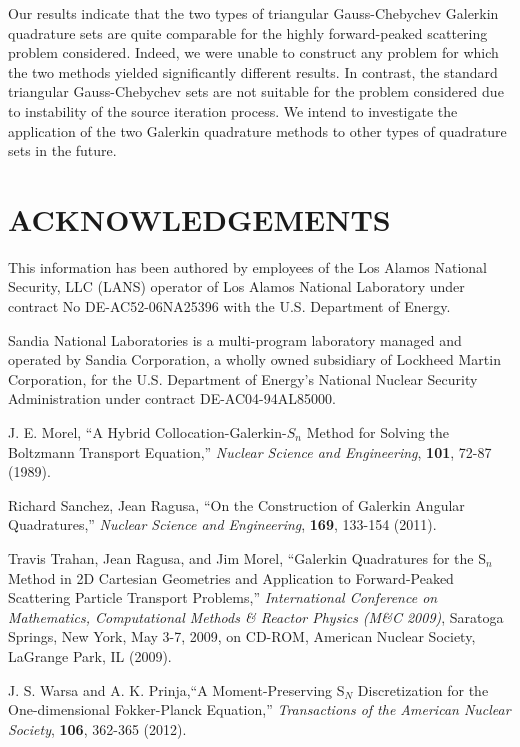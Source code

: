 \documentclass[12pt]{article}
\begin{document}
\begin{center}
Our results indicate that the two types of triangular Gauss-Chebychev Galerkin quadrature sets are quite comparable for 
the highly forward-peaked scattering problem considered.  Indeed, we were unable to construct any problem for which the two 
methods yielded significantly different results.  In contrast, the standard triangular Gauss-Chebychev sets are not suitable 
for the problem considered due to instability of the source iteration process.   We intend to investigate 
the application of the two Galerkin quadrature methods to other types of quadrature sets in the future.   

  

\section*{ACKNOWLEDGEMENTS}

This information has been authored by employees of the Los Alamos National Security, LLC (LANS) operator of Los Alamos 
National Laboratory under contract No DE-AC52-06NA25396 with the U.S. Department of Energy.

Sandia National Laboratories is a multi-program laboratory managed and operated by Sandia Corporation, a wholly owned 
subsidiary of Lockheed Martin Corporation, for the U.S. Department of Energy's National Nuclear Security Administration 
under contract DE-AC04-94AL85000.
 

\setlength{\baselineskip}{12pt}
\begin{thebibliography}{300}

 J. E. Morel, ``A Hybrid Collocation-Galerkin-$S_n$  Method for Solving the
Boltzmann Transport Equation,'' {\em Nuclear Science and Engineering}, {\bf 101}, 72-87 (1989).

 Richard Sanchez, Jean Ragusa, ``On the Construction of Galerkin Angular Quadratures,''
{\em Nuclear Science and Engineering}, {\bf 169}, 133-154 (2011).

 Travis Trahan, Jean Ragusa, and Jim Morel, ``Galerkin Quadratures for the S$_n$ 
Method in 2D Cartesian Geometries and Application to Forward-Peaked Scattering Particle Transport Problems,'' 
{\em International Conference on Mathematics, Computational Methods \& Reactor Physics (M\&C 2009)}, 
Saratoga Springs, New York, May 3-7, 2009, on CD-ROM, American Nuclear Society, LaGrange Park, IL (2009).

 J. S. Warsa and A. K. Prinja,``A Moment-Preserving S$_N$ Discretization for the One-dimensional Fokker-Planck 
Equation,'' {\em Transactions of the American Nuclear Society},  {\bf 106}, 362-365 (2012).  


\end{thebibliography}
\end{center}
\end{document}
